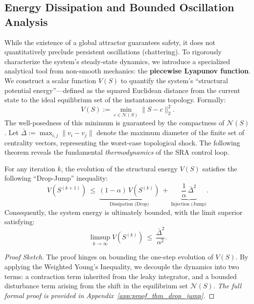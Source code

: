 \documentclass{ccjnl}
\begin{document}
\subsection{Energy Dissipation and Bounded Oscillation Analysis}
\label{subsec:lyapunov}

While the existence of a global attractor guarantees safety, it does not quantitatively preclude persistent oscillations (chattering). 
To rigorously characterize the system's steady-state dynamics, we introduce a specialized analytical tool from non-smooth mechanics: the \textbf{piecewise Lyapunov function}.
We construct a scalar function $V(S)$ to quantify the system's ``structural potential energy''---defined as the squared Euclidean distance from the current state to the ideal equilibrium set of the instantaneous topology.
Formally:
\begin{equation}\label{eq:lyapunov_def}
V(S):=\min_{c\in\mathcal N(S)}\|S-c\|_2^2.
\end{equation}
The well-posedness of this minimum is guaranteed by the compactness of $\mathcal N(S)$. 
Let $\bar{\Delta} := \max_{i,j} \|v_i - v_j\|$ denote the maximum diameter of the finite set of centrality vectors, representing the worst-case topological shock. 
The following theorem reveals the fundamental \textit{thermodynamics} of the SRA control loop.

\begin{theorem}
\label{thm:drop_jump}
For any iteration $k$, the evolution of the structural energy $V(S)$ satisfies the following ``Drop-Jump'' inequality:
\begin{equation}\label{eq:drop_jump_one_step}
V(S^{(k+1)})\ \le\ \underbrace{(1-\alpha)\,V(S^{(k)})}_{\text{Dissipation (Drop)}}\ +\ \underbrace{\dfrac{1}{\alpha}\,\bar\Delta^{2}}_{\text{Injection (Jump)}}.
\end{equation}
Consequently, the system energy is ultimately bounded, with the limit superior satisfying:
\begin{equation}\label{eq:limsup_boundedness}
\limsup_{k\to\infty}V(S^{(k)})\ \le\ \frac{\bar\Delta^{2}}{\alpha^2}.
\end{equation}
\end{theorem}
\begin{proof}[Proof Sketch]
The proof hinges on bounding the one-step evolution of $V(S)$. By applying the Weighted Young's Inequality, we decouple the dynamics into two terms: a contraction term inherited from the leaky integrator, and a bounded disturbance term arising from the shift in the equilibrium set $\mathcal N(S)$. \textit{The full formal proof is provided in Appendix~\ref{app:proof_thm_drop_jump}.}
\end{proof}
\end{document}
